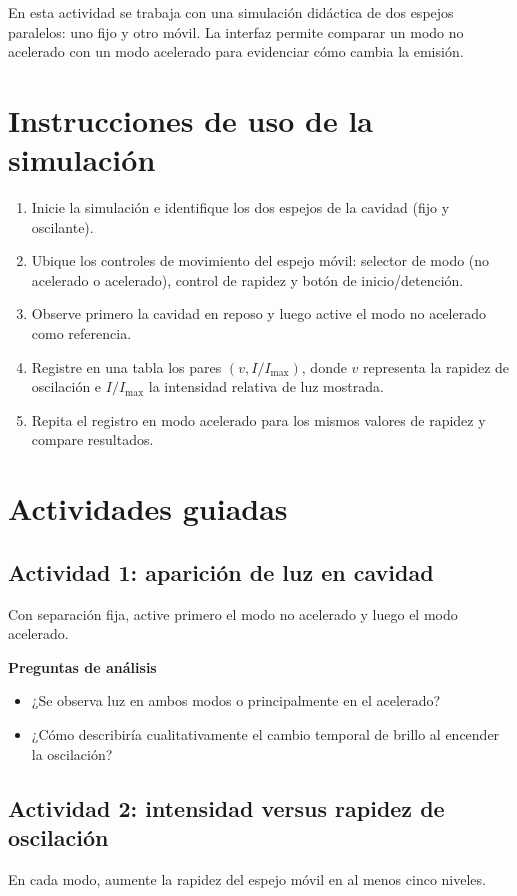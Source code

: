 \documentclass{aa}
\begin{document}
En esta actividad se trabaja con una simulación didáctica de dos espejos paralelos: uno fijo y otro móvil. La interfaz permite comparar un modo no acelerado con un modo acelerado para evidenciar cómo cambia la emisión.

\section{Instrucciones de uso de la simulación}

\begin{enumerate}
  \item Inicie la simulación e identifique los dos espejos de la cavidad (fijo y oscilante).
  \item Ubique los controles de movimiento del espejo móvil: selector de modo (no acelerado o acelerado), control de rapidez y botón de inicio/detención.
  \item Observe primero la cavidad en reposo y luego active el modo no acelerado como referencia.
  \item Registre en una tabla los pares $(v, I/I_{\max})$, donde $v$ representa la rapidez de oscilación e $I/I_{\max}$ la intensidad relativa de luz mostrada.
  \item Repita el registro en modo acelerado para los mismos valores de rapidez y compare resultados.
\end{enumerate}

\section{Actividades guiadas}

\subsection{Actividad 1: aparición de luz en cavidad}
Con separación fija, active primero el modo no acelerado y luego el modo acelerado.

\textbf{Preguntas de análisis}
\begin{itemize}
  \item ¿Se observa luz en ambos modos o principalmente en el acelerado?
  \item ¿Cómo describiría cualitativamente el cambio temporal de brillo al encender la oscilación?
\end{itemize}

\subsection{Actividad 2: intensidad versus rapidez de oscilación}
En cada modo, aumente la rapidez del espejo móvil en al menos cinco niveles.
\end{document}

